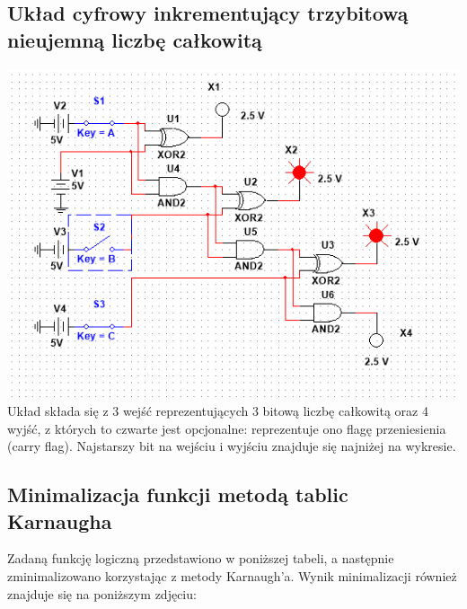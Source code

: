 \documentclass[12pt,a4paper]{article}
\begin{document}
\subsection{Układ cyfrowy inkrementujący trzybitową nieujemną liczbę całkowitą}
\includegraphics[scale=0.8]{2a}\\
Układ składa się z 3 wejść reprezentujących 3 bitową liczbę całkowitą oraz 4 wyjść, z których to czwarte jest opcjonalne: reprezentuje ono flagę przeniesienia (carry flag). Najstarszy bit na wejściu i wyjściu znajduje się najniżej na wykresie.
\newpage


\subsection{Minimalizacja funkcji metodą tablic Karnaugha}
Zadaną funkcję logiczną przedstawiono w poniższej tabeli, a następnie zminimalizowano korzystając z metody Karnaugh'a. Wynik minimalizacji również znajduje się na poniższym zdjęciu:
\end{document}
